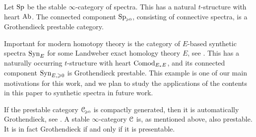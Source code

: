 \begin{example}
    Let $\mathrm{Sp}$ be the stable $\infty$-category of spectra. This has a natural $t$-structure with heart $\mathrm{Ab}$. The connected component $\mathrm{Sp}_{\hspace{-1pt}\scriptscriptstyle\geqslant 0}$, consisting of connective spectra, is a Grothendieck prestable category. 
\end{example}

\begin{example}
    Important for modern homotopy theory is the category of $E$-based synthetic spectra $\mathrm{Syn}_{E}$ for some Landweber exact homology theory $E$, see \cite{pstragowski_2022}. This has a naturally occurring $t$-structure with heart $\mathrm{Comod}_{E_*E}$, and its connected component $\mathrm{Syn}_{E, \geqslant 0}$ is Grothendieck prestable. This example is one of our main motivations for this work, and we plan to study the applications of the contents in this paper to synthetic spectra in future work. 
\end{example}



\begin{remark}
    \label{ch3:rm:stable-is-grothendieck-prestable}
    If the prestable category $\EuScript{C}_{\hspace{-1pt}\scriptscriptstyle\geqslant 0}$ is compactly generated, then it is automatically Grothendieck, see \cite[C.1.4.4]{lurie_SAG}. A stable $\infty$-category $\EuScript{C}$ is, as mentioned above, also prestable. It is in fact Grothendieck if and only if it is presentable. 
\end{remark}

